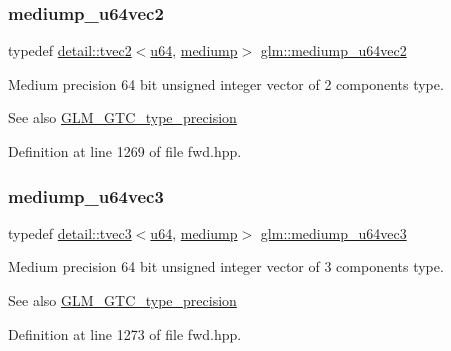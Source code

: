 \subsubsection{\texorpdfstring{mediump\+\_\+u64vec2}{mediump\_u64vec2}}
{\footnotesize\ttfamily typedef \hyperlink{structglm_1_1detail_1_1tvec2}{detail\+::tvec2}$<$\hyperlink{group__gtc__type__precision_ga71cedd4972f9cb1a5e14dfe5ab83ecd7}{u64}, \hyperlink{namespaceglm_a0f04f086094c747d227af4425893f545a6416f3ea0c9025fb21ed50c4d6620482}{mediump}$>$ \hyperlink{group__gtc__type__precision_ga9eda8d6f5be7a2919fb90412535b385f}{glm\+::mediump\+\_\+u64vec2}}

Medium precision 64 bit unsigned integer vector of 2 components type. \begin{DoxySeeAlso}{See also}
\hyperlink{group__gtc__type__precision}{G\+L\+M\+\_\+\+G\+T\+C\+\_\+type\+\_\+precision} 
\end{DoxySeeAlso}


Definition at line 1269 of file fwd.\+hpp.

\mbox{\label{group__gtc__type__precision_ga7af0601e6a8ce71bd21ecf67971f5154}} 
\subsubsection{\texorpdfstring{mediump\+\_\+u64vec3}{mediump\_u64vec3}}
{\footnotesize\ttfamily typedef \hyperlink{structglm_1_1detail_1_1tvec3}{detail\+::tvec3}$<$\hyperlink{group__gtc__type__precision_ga71cedd4972f9cb1a5e14dfe5ab83ecd7}{u64}, \hyperlink{namespaceglm_a0f04f086094c747d227af4425893f545a6416f3ea0c9025fb21ed50c4d6620482}{mediump}$>$ \hyperlink{group__gtc__type__precision_ga7af0601e6a8ce71bd21ecf67971f5154}{glm\+::mediump\+\_\+u64vec3}}

Medium precision 64 bit unsigned integer vector of 3 components type. \begin{DoxySeeAlso}{See also}
\hyperlink{group__gtc__type__precision}{G\+L\+M\+\_\+\+G\+T\+C\+\_\+type\+\_\+precision} 
\end{DoxySeeAlso}


Definition at line 1273 of file fwd.\+hpp.

\mbox{\label{group__gtc__type__precision_gae25a6609fa377ba1ec983ec32a91f1d4}} 
